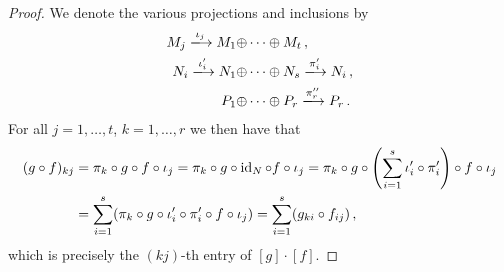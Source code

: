 \begin{proof}
  We denote the various projections and inclusions by
  \begin{align*}
                              M_j
    \xlongrightarrow{\iota_j} M_1 \oplus &\dotsb \oplus M_t \,,
    \\
                                N_i
    \xlongrightarrow{\iota'_i}  N_1 \oplus &\dotsb \oplus N_s
    \xlongrightarrow{\pi'_i}    N_i \,,
    \\
                              P_1 \oplus &\dotsb \oplus P_r
    \xlongrightarrow{\pi''_r} P_r \,.
  \end{align*}
  For all $j = 1, \dotsc, t$, $k = 1, \dotsc, r$ we then have that
  \begin{align*}
        (g \circ f)_{kj}
    &=  \pi_k \circ g \circ f \circ \iota_j
     =  \pi_k \circ g \circ \operatorname{id}_N \circ f \circ \iota_j
     =  \pi_k \circ g \circ \left( \sum_{i=1}^s \iota'_i \circ \pi'_i \right) \circ f \circ \iota_j \\
    &=  \sum_{i=1}^s ( \pi_k \circ g \circ \iota'_i \circ \pi'_i \circ f \circ \iota_j )
     =  \sum_{i=1}^s ( g_{ki} \circ f_{ij} ) \,,
  \end{align*}
  which is precisely the $(kj)$-th entry of $[g] \cdot [f]$.

\end{proof}
